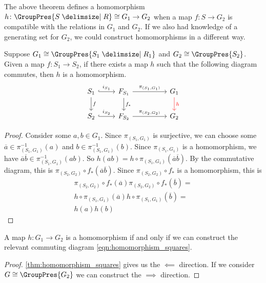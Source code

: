 The above theorem defines a homomorphism $h \colon \GroupPres{S \relations R} \cong G_1 \to G_2$ when a map $f \colon S \to G_2$ is compatible with the relations in $G_1$ and $G_2$.
If we also had knowledge of a generating set for $G_2$, we could construct homomorphisms in a different way.
\begin{theorem}
	Suppose $G_1 \cong \GroupPres{S_1 \relations R_1}$ and $G_2 \cong \GroupPres{S_2}$.
	Given a map $f \colon S_1 \to S_2$, if there exists a map  $h$ such that the following diagram commutes, then $h$ is a homomorphism.
	\begin{equation}
		\begin{tikzcd}
			S_1 \ar[d, "f"] \ar[r, hook, "i_{S_1}"] & F_{S_1} \ar[d, "f_*"] \ar[rr, "\pi_{(S_1, G_1)}"] & & \ar[d, color=red, "h"] G_1 \\
			S_2 \ar[r, hook, "i_{S_2}"] & F_{S_2} \ar[rr, "\pi_{(S_2, G_2)}"] & & G_2
		\end{tikzcd}
		\label{eqn:homomorphism_squares}
	\end{equation}
	\label{thm:homomorphism_squares}
\end{theorem}
\begin{proof}
	Consider some $a,b \in G_1$.
	Since $\pi_{(S_1,G_1)}$ is surjective, we can choose some $\overline{a} \in \pi_{(S_1,G_1)}^{-1}(a)$ and $b \in \pi_{(S_1,G_1)}^{-1}(b)$.
	Since $\pi_{(S_1,G_1)}$ is a homomorphism, we have $\overline{a}\overline{b} \in \pi_{(S_1,G_1)}^{-1}(ab)$.
	So $h(ab) = h \circ \pi_{(S_1,G_1)}(\overline{a}\overline{b})$.
	By the commutative diagram, this is $\pi_{(S_2,G_2)} \circ f_* (\overline{a}\overline{b})$.
	Since $\pi_{(S_2,G_2)} \circ f_*$ is a homomorphism, this is
	\begin{align*}
		\pi_{(S_2,G_2)} \circ f_*\left(\overline{a}\right)\pi_{(S_2,G_2)} \circ f_*\left(\overline{b}\right) =
		\\ h \circ \pi_{(S_1,G_1)}\left( \overline{a} \right) h \circ \pi_{(S_1,G_1)}\left( \overline{b} \right) =
		\\ h(a)h(b)
	\end{align*}
\end{proof}

\begin{corollary}
	A map $h \colon G_1 \to G_2$ is a homomorphism if and only if we can construct the relevant commuting diagram \eqref{eqn:homomorphism_squares}.
\end{corollary}
\begin{proof}
	\cref{thm:homomorphism_squares} gives us the $\impliedby$ direction.
	If we consider $G \cong \GroupPres{G_2}$ we can construct the  $\implies$ direction.
\end{proof}

